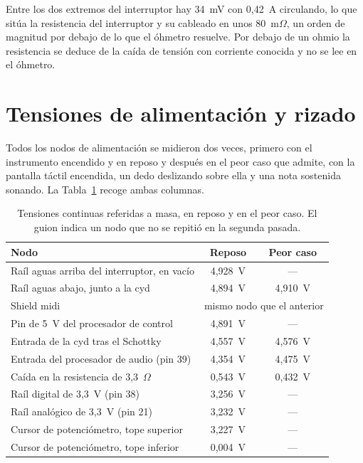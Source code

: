 Entre los dos extremos del interruptor hay 34~mV con 0,42~A
circulando, lo que sitúa la resistencia del interruptor y su cableado en unos
80~m$\Omega$, un orden de magnitud por debajo de lo que el óhmetro resuelve.
Por debajo de un ohmio la resistencia se deduce de la caída de tensión con
corriente conocida y no se lee en el óhmetro.

\section{Tensiones de alimentación y rizado}
\label{sec:tensiones}

Todos los nodos de alimentación se midieron dos veces, primero con el
instrumento encendido y en reposo y después en el peor caso que admite, con la
pantalla táctil encendida, un dedo deslizando sobre ella y una nota sostenida
sonando. La Tabla~\ref{tab:tensiones} recoge ambas columnas.

\begin{table}[htbp]
    \centering
    \caption{Tensiones continuas referidas a masa, en reposo y en el peor caso.
             El guion indica un nodo que no se repitió en la segunda pasada.}
    \label{tab:tensiones}
    \begin{tabular}{lcc}
        \toprule
        \textbf{Nodo} & \textbf{Reposo} & \textbf{Peor caso} \\
        \midrule
        Raíl aguas arriba del interruptor, en vacío & 4,928~V & --- \\
        Raíl aguas abajo, junto a la \gls{cyd}      & 4,894~V & 4,910~V \\
        Shield \gls{midi}                           & \multicolumn{2}{c}{mismo nodo que el anterior} \\
        Pin de 5~V del procesador de control        & 4,891~V & --- \\
        Entrada de la \gls{cyd} tras el Schottky    & 4,557~V & 4,576~V \\
        Entrada del procesador de audio (pin 39)    & 4,354~V & 4,475~V \\
        Caída en la resistencia de 3,3~$\Omega$     & 0,543~V & 0,432~V \\
        Raíl digital de 3,3~V (pin 38)              & 3,256~V & --- \\
        Raíl analógico de 3,3~V (pin 21)            & 3,232~V & --- \\
        Cursor de potenciómetro, tope superior      & 3,227~V & --- \\
        Cursor de potenciómetro, tope inferior      & 0,004~V & --- \\
        \bottomrule
    \end{tabular}
\end{table}


